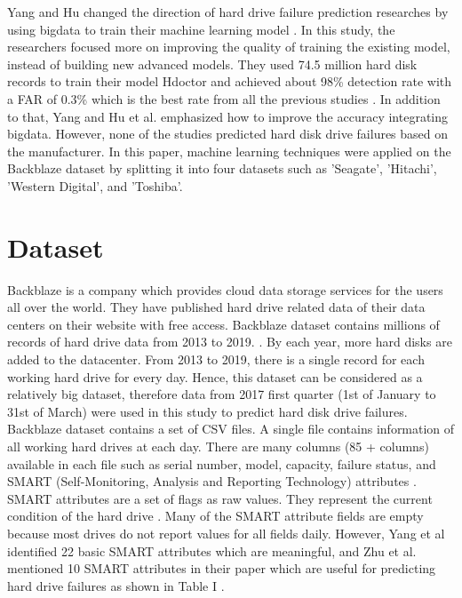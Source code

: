 \documentclass[conference]{IEEEtran}
\begin{document}
Yang and Hu changed the direction of hard drive failure prediction researches by using bigdata to train their machine learning model \cite{b10}. In this study, the researchers focused more on improving the quality of training the existing model, instead of building new advanced models. They used 74.5 million hard disk records to train their model Hdoctor and achieved about 98\% detection rate with a FAR of 0.3\% which is the best rate from all the previous studies \cite{b10}. In addition to that, Yang and Hu et al. emphasized how to improve the accuracy integrating bigdata. However, none of the studies predicted hard disk drive failures based on the manufacturer. In this paper, machine learning techniques were applied on the Backblaze dataset by splitting it into four datasets such as 'Seagate', 'Hitachi', 'Western Digital', and 'Toshiba'.\\



\section{Dataset}

Backblaze is a company which provides cloud data storage services for the users all over the world. They have published hard drive related data of their data centers on their website with free access. Backblaze dataset contains millions of records of hard drive data from 2013 to 2019.  \cite{b15}. By each year, more hard disks are added to the datacenter. From 2013 to 2019, there is a single record for each working hard drive for every day. Hence, this dataset can be considered as a relatively big dataset, therefore data from 2017 first quarter (1st of January to 31st of March) were used in this study to predict hard disk drive failures.\\

Backblaze dataset contains a set of CSV files. A single file contains information of all working hard drives at each day. There are many columns (85 + columns) available in each file such as serial number, model, capacity, failure status, and SMART (Self-Monitoring, Analysis and Reporting Technology) attributes \cite{b16}. SMART attributes are a set of flags as raw values. They represent the current condition of the hard drive \cite{b4}. Many of the SMART attribute fields are empty because most drives do not report values for all fields daily. However, Yang et al identified 22 basic SMART attributes which are meaningful, and Zhu et al. mentioned 10 SMART attributes in their paper which are useful for predicting hard drive failures as shown in Table I \cite{b4,b10}.\\
\end{document}
